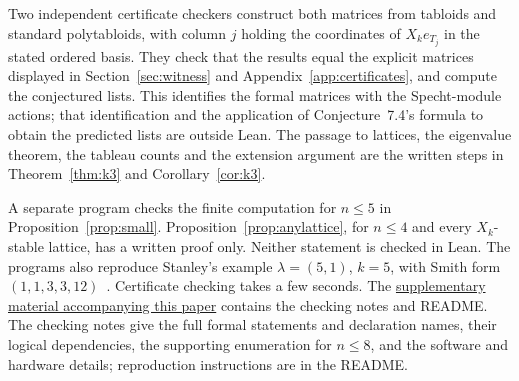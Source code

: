 \documentclass[11pt]{article}
\theoremstyle{remark}
\begin{document}
Two independent certificate checkers construct both matrices from tabloids
and standard polytabloids, with column $j$ holding the coordinates of
$X_k e_{T_j}$ in the stated ordered basis. They check that the results equal
the explicit matrices displayed in Section~\ref{sec:witness} and
Appendix~\ref{app:certificates}, and compute the conjectured lists. This
identifies the formal matrices with the Specht-module actions; that
identification and the application of Conjecture~7.4's formula to obtain the
predicted lists are outside Lean. The passage to lattices, the eigenvalue
theorem, the tableau counts and the extension argument are the written steps
in Theorem~\ref{thm:k3} and Corollary~\ref{cor:k3}.

A separate program checks the finite computation for $n\le5$ in
Proposition~\ref{prop:small}. Proposition~\ref{prop:anylattice}, for $n\le4$
and every $X_k$-stable lattice, has a written proof only. Neither statement is
checked in Lean. The programs also reproduce Stanley's example
$\lambda=(5,1)$, $k=5$, with Smith form $(1,1,3,3,12)$~\cite[example following
Conjecture~7.4]{stanley}. Certificate checking takes a few seconds.
The \href{https://github.com/6/clank-lab/tree/stanley-smith-forms-v4/results/stanley-smith-forms}{supplementary material accompanying this paper} contains the checking notes and README. The checking notes give the full formal statements and declaration names,
their logical dependencies, the supporting enumeration for $n\le8$, and
the software and hardware details; reproduction instructions are in the
README.
\end{document}
